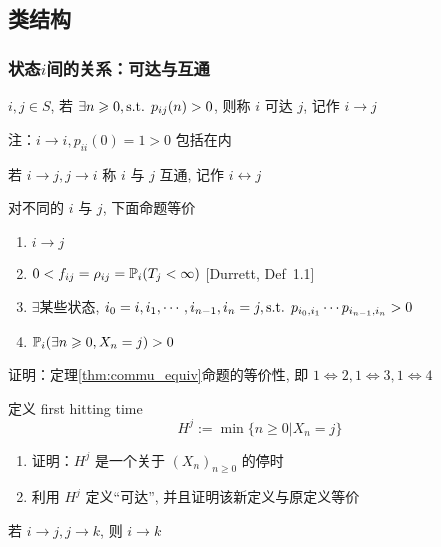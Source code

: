 \subsection{类结构}
\subsubsection{状态$i$间的关系：可达与互通}

\begin{definition}[可达]
    $i,j\in S$, 若 $\exists n\geqslant 0,\text{s.t. } p_{ij}(n)>0$, 则称 $i$ 可达 $j$, 记作 $i\to j$

    注：$i\to i,p_{ii}(0)=1>0$ 包括在内
\end{definition}

\begin{definition}[互通]
    若 $i\to j,j\to i$ 称 $i$ 与 $j$ 互通, 记作 $i\leftrightarrow j$
\end{definition}

\begin{theorem}\label{thm:commu_equiv}
    对不同的 $i$ 与 $j$, 下面命题等价
    \begin{enumerate}
        \item $i\to j$
        \item $0<f_{ij}=\rho_{ij}=\mathbb{P}_i(T_j<\infty)$ [Durrett\cite{durrett}, Def\ 1.1]
        \item $\exists$某些状态, $i_0=i,i_1,\cdots,i_{n-1},i_n=j,\text{s.t. } p_{i_0,i_1}\cdots p_{i_{n-1},i_n}>0$
        \item $\mathbb{P}_i(\exists n\geqslant 0,X_n=j)>0$
    \end{enumerate}
\end{theorem}

\begin{problem}[作业6-1]
    证明：定理\ref{thm:commu_equiv}命题的等价性, 即 $1\Leftrightarrow 2,1\Leftrightarrow 3, 1\Leftrightarrow 4$
\end{problem}

\begin{problem}[作业6-2]
    定义 first hitting time
    \[
    H^j:=\min\{n\geq 0|X_n=j\}
    \]
    \begin{enumerate}
        \item 证明：$H^j$ 是一个关于 $(X_n)_{n\geq 0}$ 的停时
        \item 利用 $H^j$ 定义“可达”, 并且证明该新定义与原定义等价
    \end{enumerate}
\end{problem}

\begin{property}
    若 $i\to j,j\to k$, 则 $i\to k$
\end{property}

